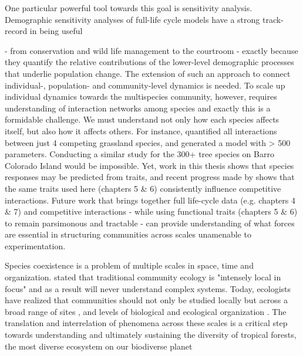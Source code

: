 \documentclass[b5paper,justified]{tufte-book} %
\begin{document}
One particular powerful tool towards this goal is sensitivity analysis. Demographic sensitivity analyses of full-life cycle models \citep{DeKroon1986} have a strong track-record in being useful \begin{fullwidth} - from conservation \citep{Caswell2000, Morris2003} and wild life management \citep{Wallace2013} to the courtroom \citep{Swartzman1996} - exactly because they quantify the relative contributions of the lower-level demographic processes that underlie population change. The extension of such an approach to connect individual-, population- and community-level dynamics is needed. To scale up individual dynamics towards the multispecies community, however, requires understanding of interaction networks among species and exactly this is a formidable challenge. We must understand not only how each species affects itself, but also how it affects others. For instance, \citet{Adler2010} quantified all interactions between just 4 competing grassland species, and generated a model with > 500 parameters. Conducting a similar study for the 300+ tree species on Barro Colorado Island would be impossible. Yet, work in this thesis shows that species responses may be predicted from traits, and recent progress made by \citet{Kunstler2016} shows that the same traits used here (chapters 5 \& 6) consistently influence competitive interactions.  Future work that brings together full life-cycle data (e.g. chapters 4 \& 7) and competitive interactions - while using functional traits (chapters 5 \& 6) to remain parsimonous and tractable - can provide understanding of what forces are essential in structuring communities across scales unamenable to experimentation.   

Species coexistence is a problem of multiple scales in space, time and organization. \citet{Lawton1999} stated that traditional community ecology is "intensely local in focus" and as a result will never understand complex systems. Today, ecologists have realized that communities should not only be studied locally but across a broad range of sites \citep{Chave2013, Borer2014}, and levels of biological and ecological organization \citep{Holt2007, Holt2016}. The translation and interrelation of phenomena across these scales is a critical step towards understanding and ultimately sustaining the diversity of tropical forests, the most diverse ecosystem on our biodiverse planet \end{fullwidth}

\backmatter
\end{document}
